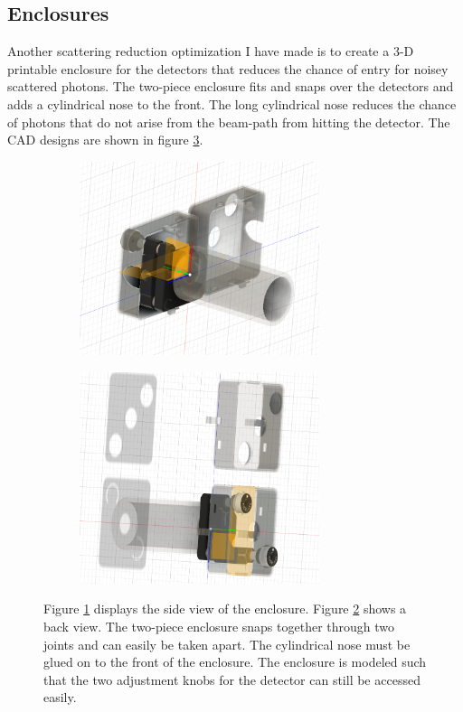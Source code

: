 \documentclass[letterpaper, 11 pt]{article}
\begin{document}
\subsection{Enclosures}

Another scattering reduction optimization I have made is to create a 3-D
printable enclosure for the detectors that reduces the chance of entry for
noisey scattered photons. The two-piece enclosure fits and snaps over the
detectors and adds a cylindrical nose to the front. The long cylindrical nose
reduces the chance of photons that do not arise from the beam-path from hitting
the detector. The CAD designs are shown in figure \ref{fig:cad_enclose}.
\begin{figure}[H]%
        \centering
        \begin{subfigure}{.4\textwidth}
        \includegraphics[width=7cm]{enclosure_1.png}
        \caption{ }
        \label{fig:side}
        \end{subfigure}
        \begin{subfigure}{.4\textwidth}
        \includegraphics[width = 7cm]{enclosure_2.png}
        \caption{ }
        \label{fig:back}
        \end{subfigure}
        \caption{Figure \ref{fig:side} displays the side view of the enclosure.
        Figure \ref{fig:back} shows a back view. The two-piece enclosure snaps
        together through two joints and can easily be taken apart. The
        cylindrical nose must be glued on to the front of the enclosure. The enclosure
        is modeled such that the two adjustment knobs for the detector can still be
        accessed easily.}
        \label{fig:cad_enclose}
    \end{figure}
\end{document}
